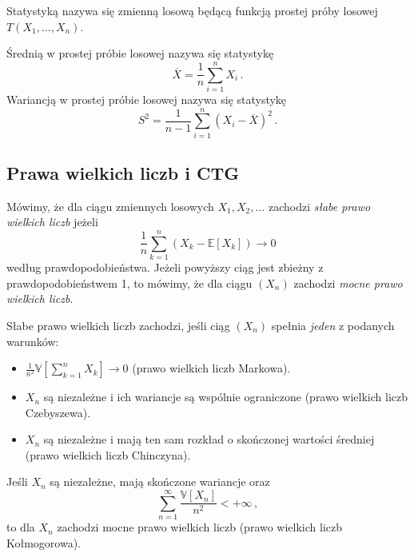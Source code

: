 \documentclass{myclass}
\numberwithin{equation}{subsection}
\begin{document}
\begin{definition}[Statystyki]
Statystyką nazywa się zmienną losową będącą funkcją prostej próby losowej \(T(X_1,\ldots,X_n)\).
\end{definition}
Średnią w prostej próbie losowej nazywa się statystykę
\begin{equation}
    \overline{X} = \frac{1}{n}\sum_{i=1}^n X_i\,.
\end{equation}
Wariancją w prostej próbie losowej nazywa się statystykę
\begin{equation}
    S^2 = \frac{1}{n - 1}\sum_{i=1}^n (X_i - \overline{X})^2\,.
\end{equation}


\subsection{Prawa wielkich liczb i CTG}

\begin{definition}
Mówimy, że dla ciągu zmiennych losowych \(X_1,X_2,\ldots\) zachodzi \emph{słabe prawo wielkich
liczb} jeżeli
\begin{equation*}
    \frac{1}{n} \sum_{k=1}^n\left(X_k - \mathbb{E}[X_k]\right) \to 0
\end{equation*}
według prawdopodobieństwa. Jeżeli powyższy ciąg jest zbieżny z prawdopodobieństwem 1, to mówimy, że
dla ciągu \((X_n)\) zachodzi \emph{mocne prawo wielkich liczb}.
\end{definition}

\begin{theorem}
Słabe prawo wielkich liczb zachodzi, jeśli ciąg \((X_n)\) spełnia \emph{jeden} z podanych warunków:
\begin{itemize}

    \item \(\frac{1}{n^2}\mathbb{V}\left[\sum_{k=1}^n X_k\right] \to 0\) (prawo wielkich liczb
    Markowa).

    \item \(X_n\) są niezależne i ich wariancje są wspólnie ograniczone (prawo wielkich liczb
    Czebyszewa).

    \item \(X_n\) są niezależne i mają ten sam rozkład o skończonej wartości średniej (prawo
    wielkich liczb Chinczyna).
    
\end{itemize}
\end{theorem}

\begin{theorem}
Jeśli \(X_n\) są niezależne, mają skończone wariancje oraz
\begin{equation*}
    \sum_{n=1}^\infty \frac{\mathbb{V}[X_n]}{n^2} < +\infty\,,
\end{equation*}
to dla \(X_n\) zachodzi mocne prawo wielkich liczb (prawo wielkich liczb Kołmogorowa).
\end{theorem}
\end{document}

